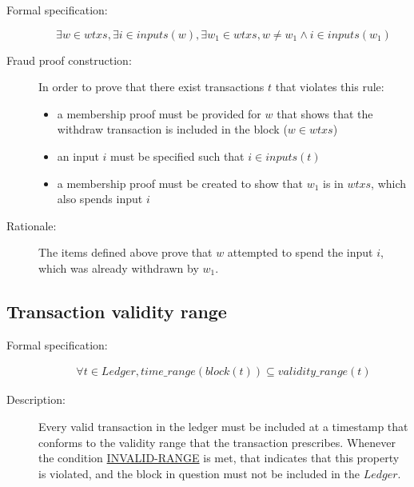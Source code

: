 \documentclass[../main.tex]{subfiles}
\begin{document}
\begin{description}

\item[Formal specification:]
\begin{equation*}
    \exists w \in wtxs, \exists i \in inputs(w), \exists w_1 \in wtxs, w \neq w_1 \land i \in inputs(w_1)
\end{equation*}

\item[Fraud proof construction:] In order to prove that there exist transactions $t$ that violates this rule:
\begin{itemize}
    \item a membership proof must be provided for $w$ that shows that the withdraw transaction is included in the block ($w \in wtxs$)
    \item an input $i$ must be specified such that $i \in inputs(t)$
    \item a membership proof must be created to show that $w_1$ is in $wtxs$, which also spends input $i$
\end{itemize}

\item[Rationale:] The items defined above prove that $w$ attempted to spend the input $i$, which was already withdrawn by $w_1$.

\end{description}

\subsection{Transaction validity range}

\begin{description}

\item[Formal specification:]
\begin{equation*}
\begin{split}
    \forall t \in Ledger, time\_range(block(t)) \subseteq validity\_range(t)
\end{split}
\end{equation*}

\item[Description:] Every valid transaction in the ledger must be included at a timestamp that conforms to the validity range that the transaction prescribes. Whenever the condition \hyperref[sec:INVALID-RANGE]{INVALID-RANGE} is met, that indicates that this property is violated, and the block in question must not be included in the $Ledger$.

\end{description}
\end{document}
